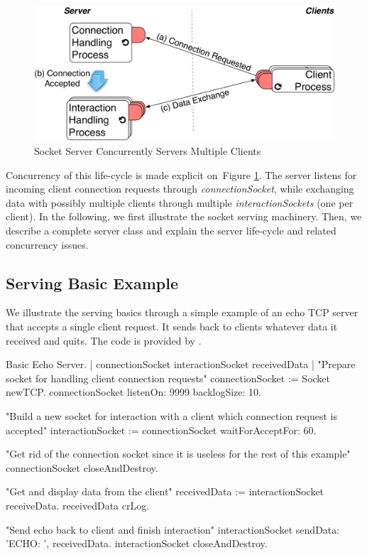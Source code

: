 \documentclass[a4paper,10pt,twoside]{book}
\begin{document}
\begin{figure}[ht]\centering
	\includegraphics[width=.75\linewidth]{tcpSocketServerLifeCycle}
	\caption{Socket Server Concurrently Servers Multiple Clients}
	\label{fig:socketServerLifeCycle}
\end{figure}

Concurrency of this life-cycle is made explicit on~Figure \ref{fig:socketServerLifeCycle}.
The server listens for incoming client connection requests through \textit{connectionSocket}, while exchanging data with possibly multiple clients through multiple \textit{interactionSockets} (one per client).
In the following, we first illustrate the socket serving machinery.
Then, we describe a complete server class and explain the server life-cycle and related concurrency issues.

\subsection{Serving Basic Example}
We illustrate the serving basics through a simple example of an echo TCP server that accepts a single client request.
It sends back to clients whatever data it received and quits.
The code is provided by .

\begin{script}[servingBasicExample]{Basic Echo Server.}
| connectionSocket interactionSocket receivedData |
"Prepare socket for handling client connection requests"
connectionSocket := Socket newTCP.
connectionSocket listenOn: 9999 backlogSize: 10.

"Build a new socket for interaction with a client which connection request is accepted"
interactionSocket := connectionSocket waitForAcceptFor: 60.

"Get rid of the connection socket since it is useless for the rest of this example"
connectionSocket closeAndDestroy.

"Get and display data from the client"
receivedData := interactionSocket receiveData.
receivedData crLog.

"Send echo back to client and finish interaction"
interactionSocket sendData: 'ECHO: ', receivedData.
interactionSocket closeAndDestroy.
\end{script}
\end{document}
